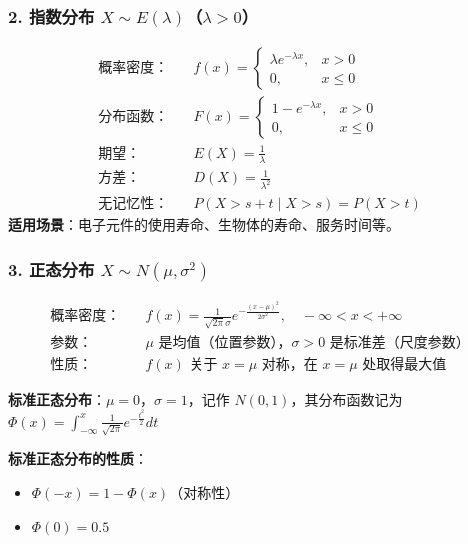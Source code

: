\documentclass[12pt,a4paper]{ctexart}
\begin{document}
\subsubsection{2. 指数分布 $X \sim E(\lambda)$（$\lambda > 0$）}
\begin{align*}
    \text{概率密度：} & \quad f(x) = \begin{cases} \lambda e^{-\lambda x}, & x > 0 \\ 0, & x \le 0 \end{cases} \\
    \text{分布函数：} & \quad F(x) = \begin{cases} 1 - e^{-\lambda x}, & x > 0 \\ 0, & x \le 0 \end{cases}     \\
    \text{期望：}   & \quad E(X) = \frac{1}{\lambda}                                                         \\
    \text{方差：}   & \quad D(X) = \frac{1}{\lambda^2}                                                       \\
    \text{无记忆性：} & \quad P(X > s+t \mid X > s) = P(X > t)
\end{align*}
\textbf{适用场景}：电子元件的使用寿命、生物体的寿命、服务时间等。

\subsubsection{3. 正态分布 $X \sim N(\mu, \sigma^2)$}
\begin{align*}
    \text{概率密度：} & \quad f(x) = \frac{1}{\sqrt{2\pi}\sigma} e^{-\frac{(x-\mu)^2}{2\sigma^2}},\quad -\infty < x < +\infty \\
    \text{参数：}   & \quad \mu\text{ 是均值（位置参数），}\sigma > 0\text{ 是标准差（尺度参数）}                                               \\
    \text{性质：}   & \quad f(x)\text{ 关于 }x = \mu\text{ 对称，在 }x = \mu\text{ 处取得最大值}
\end{align*}

\textbf{标准正态分布}：$\mu = 0$，$\sigma = 1$，记作 $N(0,1)$，其分布函数记为 $\Phi(x) = \int_{-\infty}^x \frac{1}{\sqrt{2\pi}} e^{-\frac{t^2}{2}} dt$

\textbf{标准正态分布的性质}：
\begin{itemize}[noitemsep]
    \item $\Phi(-x) = 1 - \Phi(x)$（对称性）
    \item $\Phi(0) = 0.5$
\end{itemize}
\end{document}
